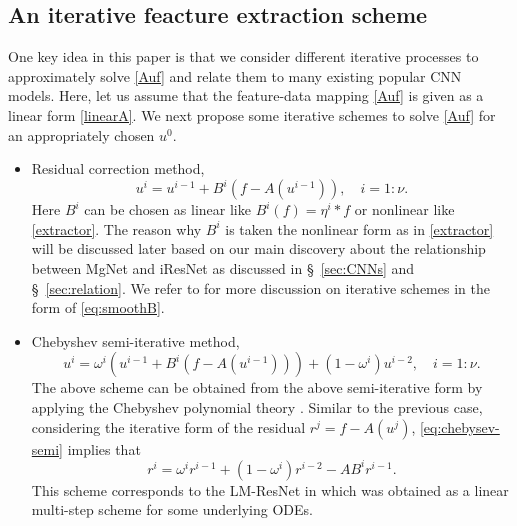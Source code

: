 \subsection{An iterative feacture extraction scheme}
One key idea in this paper is that we consider different iterative
	processes to approximately solve \eqref{Auf} and relate them to
	many existing popular CNN models. Here, let us assume that 
	the feature-data mapping \eqref{Auf}  is given as a linear form \eqref{linearA}.
	We next propose some iterative schemes to solve \eqref{Auf}
	for an appropriately chosen $u^0$.
	\begin{itemize}
		\item Residual correction method, 
		\begin{equation}\label{eq:smoothB}
		u^{i} = u^{i-1} + B^{i}(f- A(u^{i-1})), \quad i=1:\nu.
		\end{equation}
		Here $B^i$ can be chosen as linear like $B^{i}(f) = \eta^i \ast f$ or nonlinear
		like \eqref{extractor}. The reason why $B^{i}$ is taken
		the nonlinear form as in \eqref{extractor} will be discussed later based on our
		main discovery about the relationship
		between MgNet and iResNet as discussed in \S~\ref{sec:CNNs} and \S~\ref{sec:relation}. 
		We refer to \cite{xu1992iterative}
		for more discussion on iterative schemes in the form of \eqref{eq:smoothB}.
		\item Chebyshev semi-iterative method, 
		\begin{equation}\label{eq:chebysev-semi}
		u^{i} = \omega^i\left(u^{i-1} + B^{i}\left(f- A(u^{i-1})\right)\right)+ (1- \omega^i) u^{i-2},\quad i=1:\nu.
		\end{equation}
		The above scheme can be obtained from the above semi-iterative form
		by applying the Chebyshev polynomial theory \cite{hackbusch1994iterative, golub2012matrix}. 
		Similar to the previous case, considering the iterative form of the residual $r^j = f - A(u^{j})$,
		\eqref{eq:chebysev-semi} implies that
		\begin{equation}
		r^{i} = \omega^i r^{i-1} + (1-\omega^i)r^{i-2} - AB^i r^{i-1}.
		\end{equation}
		This scheme corresponds to the LM-ResNet in \cite{lu2018beyond} 
		which was obtained as a linear multi-step scheme for some underlying ODEs.
	\end{itemize}